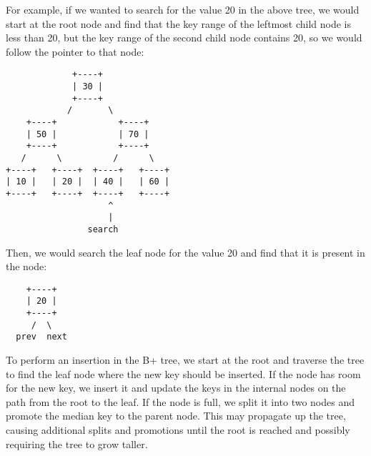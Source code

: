 \documentclass{article}
\begin{document}
For example, if we wanted to search for the value 20 in the above tree, we would start at the root node and find that the key range of the leftmost child node is less than 20, but the key range of the second child node contains 20, so we would follow the pointer to that node:
\begin{lstlisting}
             +----+
             | 30 |
             +----+
            /       \
    +----+            +----+
    | 50 |            | 70 |
    +----+            +----+
   /      \          /      \
+----+   +----+  +----+   +----+
| 10 |   | 20 |  | 40 |   | 60 |
+----+   +----+  +----+   +----+
                    ^
                    |
                search

\end{lstlisting}
Then, we would search the leaf node for the value 20 and find that it is present in the node:
\begin{lstlisting}
    +----+
    | 20 |
    +----+
     /  \
  prev  next

\end{lstlisting}
To perform an insertion in the B+ tree, we start at the root and traverse the tree to find the leaf node where the new key should be inserted. If the node has room for the new key, we insert it and update the keys in the internal nodes on the path from the root to the leaf. If the node is full, we split it into two nodes and promote the median key to the parent node. This may propagate up the tree, causing additional splits and promotions until the root is reached and possibly requiring the tree to grow taller.\\
\end{document}
